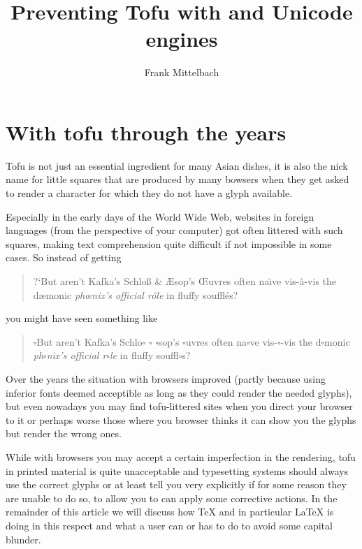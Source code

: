 \documentclass{ltugboat}
\author{Frank Mittelbach}
\title{Preventing Tofu with \pdfTeX{} and Unicode engines}
\newcommand\tofu{$\square$}
\begin{document}
\maketitle

\begin{abstract}

\end{abstract}

\tableofcontents

\section{With tofu through the years}

Tofu is not just an essential ingredient for many Asian dishes, it is
also the nick name for little squares that are produced by many
bowsers when they get asked to render a character for which they do
not have a glyph available.

Especially in the early days of the World Wide Web,
websites in foreign languages (from the perspective of your computer)
got often littered with such squares, making text comprehension quite
difficult if not impossible in some cases. So instead of getting
\begin{quote}
  ?`But aren't Kafka's Schlo{\ss} \&
  {\AE}sop's {\OE}uvres often na{\"\i}ve vis-\`{a}-vis the d{\ae}monic
  \textit{ph{\oe}nix's official r\^{o}le} in fluffy souffl\'{e}s?
\end{quote}
you might have seen something like
\begin{quote}
  \tofu But aren't Kafka's Schlo{\tofu} \tofu{} {\tofu}sop's
  \tofu{}uvres often na{\tofu}ve vis-\tofu{}-vis the d{\tofu}monic
  \textit{ph{\tofu}nix's official r\tofu{}le} in fluffy
  souffl\tofu{}s?
\end{quote}
Over the years the situation with browsers improved (partly because
using inferior fonts deemed acceptible as long as they could render
the needed glyphs), but even nowadays you may find tofu-littered sites
when you direct your browser to it or perhaps worse those where you
browser thinks it can show you the glyphs but render the wrong ones.

While with browsers you may accept a certain imperfection in the
rendering, tofu in printed material is quite unacceptable and
typesetting systems should always use the correct glyphs or at least
tell you very explicitly if for some reason they are unable to do so,
to allow you to can apply some corrective actions. In the remainder of
this article we will discuss how \TeX{} and in particular \LaTeX{} is
doing in this respect and what a user can or has to do to avoid some
capital blunder.
\end{document}
